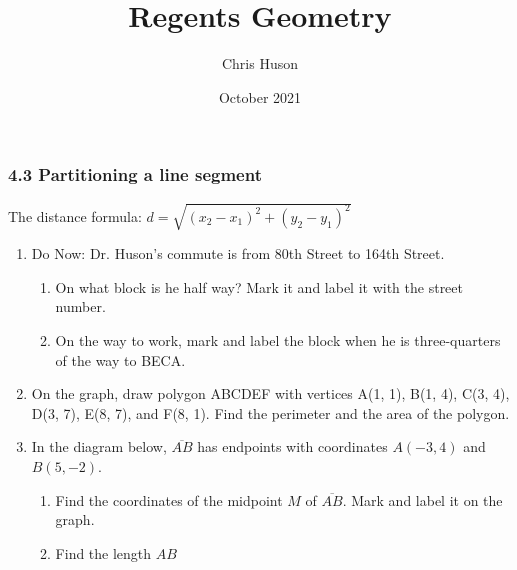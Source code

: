 \documentclass[12pt, twoside]{article}
\title{Regents Geometry}
\author{Chris Huson}
\date{October 2021}
\begin{document}
\subsubsection*{4.3 Partitioning a line segment}
The distance formula: $\displaystyle d=\sqrt{(x_2-x_1)^2+(y_2-y_1)^2}$
\begin{enumerate}
\item Do Now: Dr. Huson's commute is from 80th Street to 164th Street. 
\begin{enumerate}
  \item On what block is he half way? Mark it and label it with the street number.
  \item On the way to work, mark and label the block when he is three-quarters of the way to BECA.
\end{enumerate}
  \vspace{5cm}

  \item On the graph, draw polygon ABCDEF with vertices A(1, 1), B(1, 4), C(3, 4), D(3, 7), E(8, 7), and F(8, 1). Find the perimeter and the area of the polygon.
  \begin{flushleft}
    \end{flushleft}
  \vspace{2cm}

\newpage
\item In the diagram below, $\overline{AB}$ has endpoints with coordinates $A(-3,4)$ and $B(5, -2)$.
\begin{enumerate}
  \item Find the coordinates of the midpoint $M$ of $\overline{AB}$. Mark and label it on the graph.
  \item Find the length $AB$
\end{enumerate}


\end{enumerate}
\end{document}

